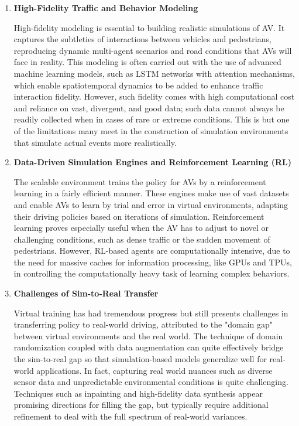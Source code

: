 \documentclass[lettersize,journal]{IEEEtran}
\begin{document}
\begin{enumerate}
    \item \textbf{High-Fidelity Traffic and Behavior Modeling}

    High-fidelity modeling is essential to building realistic simulations of AV. It captures the subtleties of interactions between vehicles and pedestrians, reproducing dynamic multi-agent scenarios and road conditions that AVs will face in reality. This modeling is often carried out with the use of advanced machine learning models, such as LSTM networks with attention mechanisms, which enable spatiotemporal dynamics to be added to enhance traffic interaction fidelity. However, such fidelity comes with high computational cost and reliance on vast, divergent, and good data; such data cannot always be readily collected when in cases of rare or extreme conditions. This is but one of the limitations many meet in the construction of simulation environments that simulate actual events more realistically.

    \item \textbf{Data-Driven Simulation Engines and Reinforcement Learning (RL)}

    The scalable environment trains the policy for AVs by a reinforcement learning in a fairly efficient manner. These engines make use of vast datasets and enable AVs to learn by trial and error in virtual environments, adapting their driving policies based on iterations of simulation. Reinforcement learning proves especially useful when the AV has to adjust to novel or challenging conditions, such as dense traffic or the sudden movement of pedestrians. However, RL-based agents are computationally intensive, due to the need for massive caches for information processing, like GPUs and TPUs, in controlling the computationally heavy task of learning complex behaviors.

    \item \textbf{Challenges of Sim-to-Real Transfer}

    Virtual training has had tremendous progress but still presents challenges in transferring policy to real-world driving, attributed to the "domain gap" between virtual environments and the real world. The technique of domain randomization coupled with data augmentation can quite effectively bridge the sim-to-real gap so that simulation-based models generalize well for real-world applications. In fact, capturing real world nuances such as diverse sensor data and unpredictable environmental conditions is quite challenging. Techniques such as inpainting and high-fidelity data synthesis appear promising directions for filling the gap, but typically require additional refinement to deal with the full spectrum of real-world variances.


\end{enumerate}
\end{document}
